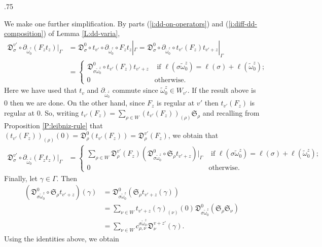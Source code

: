 \documentclass[11pt,fleqn]{amsart}
\makeatletter
\renewcommand\proofname{Proof}
\renewenvironment{proof}[1][\textit{\proofname}]{\par
 \pushQED{\qed}%
 \normalfont \topsep.75\paraskip\relax
 \trivlist
 \item[\hskip\labelsep
 \itshape
 #1\@addpunct{.}]\ignorespaces
}{%
 \popQED\endtrivlist\@endpefalse
}
\newcounter{para}[section]
\newcommand\D[3]{{}^{#1} \mathfrak D_{#2}^{#3}}
\renewcommand\SS{\mathfrak S}
\makeatother
\begin{document}
\begin{proof}
We make one further simplification. By parts (\ref{i:dd-on-operators}) and
(\ref{i:diff-dd-composition}) of Lemma \ref{L:dd-varia},
\begin{align*}
\D{}{\sigma}{v'} \circ 
	\partial_{\widetilde \omega_0^z}(F_z t_z) |_\Gamma
	&= \D{}{\sigma}{0} \circ t_{v'} \circ \partial_{\widetilde \omega_0^z} 
		\circ F_z t_z |_\Gamma
	= \D{}{\sigma}{0} \circ \partial_{\widetilde \omega_0^z} \circ t_{v'}(F_z) 
		t_{v'+z} |_\Gamma \\
	&= \begin{cases}
		\D{}{\sigma \widetilde \omega_0^z}{0} \circ t_{v'}(F_z) t_{v'+z}
			& \mbox{ if } \ell(\sigma \widetilde \omega_0^z) = \ell(\sigma)
				+ \ell(\widetilde \omega_0^z);\\
		0 & \mbox{otherwise.}
	\end{cases}
\end{align*}
Here we have used that $t_v$ and $\partial_{\widetilde \omega_0^z}$ commute since
$\widetilde \omega_0^z \in W_{v'}$. If the result above is $0$ then we are done. On the 
other hand, since $F_z$ is regular at $v'$ then $t_{v'}(F_z)$ is regular at 
$0$. So, writing $t_{v'}(F_z) = \sum_{\rho \in W} (t_{v'}(F_z))_{(\rho)} 
\SS_\rho$ and recalling from Proposition \ref{P:leibniz-rule} that 
$(t_{v'}(F_z))_{(\rho)}(0) = \D{}{\rho}{0}(t_{v'}(F_z)) = \D{}{\rho}{v'}(F_z)$,
we obtain that
\begin{align*}
\D{}{\sigma}{v'} \circ \partial_{\widetilde \omega_0^z} (F_z t_z)|_\Gamma
	&= \begin{cases}
		\sum_{\rho \in W} 
			\D{}{\rho}{v'}(F_z)
				(\D{}{\sigma \widetilde \omega_0^z}{0} \circ 
					\SS_\rho t_{v'+z})|_\Gamma
			& \mbox{ if } \ell(\sigma \widetilde \omega_0^z) = \ell(\sigma)
				+ \ell(\widetilde \omega_0^z);\\
		0 & \mbox{otherwise.}
	\end{cases}
\end{align*}
Finally, let $\gamma \in \Gamma$. Then 
\begin{align*}
(\D{}{\sigma \widetilde \omega_0^z}{0} \circ \SS_\rho t_{v'+z}) (\gamma)
	&= \D{}{\sigma \widetilde \omega_0^z}{0}(\SS_\rho t_{v'+z}(\gamma)) \\
	&= \sum_{\nu \in W} t_{v'+z}(\gamma)_{(\nu)}(0)
		\D{}{\sigma \widetilde \omega_0^z}{0} (\SS_{\rho} \SS_{\nu}) \\
	&= \sum_{\nu \in W}
		c^{\sigma \widetilde \omega_0^z}_{\rho, \nu} \D{}{\nu}{v+z'}(\gamma).
\end{align*} 
Using the identities above,  we obtain
\begin{align*}

\end{align*}
\end{proof}
\end{document}
